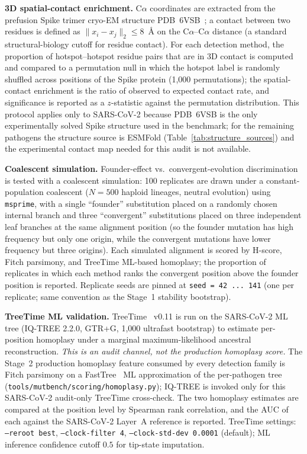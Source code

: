 \textbf{3D spatial-contact enrichment.} C$\alpha$ coordinates are extracted from the prefusion Spike trimer cryo-EM structure PDB~6VSB~\cite{wrapp2020cryo}; a contact between two residues is defined as $\|x_i - x_j\|_2 \leq 8$~\AA{} on the C$\alpha$--C$\alpha$ distance (a standard structural-biology cutoff for residue contact). For each detection method, the proportion of hotspot--hotspot residue pairs that are in 3D contact is computed and compared to a permutation null in which the hotspot label is randomly shuffled across positions of the Spike protein (1{,}000 permutations); the spatial-contact enrichment is the ratio of observed to expected contact rate, and significance is reported as a $z$-statistic against the permutation distribution. This protocol applies only to SARS-CoV-2 because PDB~6VSB is the only experimentally solved Spike structure used in the benchmark; for the remaining pathogens the structure source is ESMFold (Table~\ref{tab:structure_sources}) and the experimental contact map needed for this audit is not available.

\textbf{Coalescent simulation.} Founder-effect vs.\ convergent-evolution discrimination is tested with a coalescent simulation: 100 replicates are drawn under a constant-population coalescent ($N = 500$ haploid lineages, neutral evolution) using \texttt{msprime}, with a single ``founder'' substitution placed on a randomly chosen internal branch and three ``convergent'' substitutions placed on three independent leaf branches at the same alignment position (so the founder mutation has high frequency but only one origin, while the convergent mutations have lower frequency but three origins). Each simulated alignment is scored by H-score, Fitch parsimony, and TreeTime ML-based homoplasy; the proportion of replicates in which each method ranks the convergent position above the founder position is reported. Replicate seeds are pinned at \texttt{seed = 42\,...\,141} (one per replicate; same convention as the Stage~1 stability bootstrap).

\textbf{TreeTime ML validation.} TreeTime~\cite{sagulenko2018treetime} v0.11 is run on the SARS-CoV-2 ML tree (IQ-TREE 2.2.0, GTR+G, 1{,}000 ultrafast bootstrap) to estimate per-position homoplasy under a marginal maximum-likelihood ancestral reconstruction. \emph{This is an audit channel, not the production homoplasy score.} The Stage~2 production homoplasy feature consumed by every detection family is Fitch parsimony on a FastTree~\cite{price2010fasttree} ML approximation of the per-pathogen tree (\texttt{tools/mutbench/scoring/homoplasy.py}); IQ-TREE is invoked only for this SARS-CoV-2 audit-only TreeTime cross-check. The two homoplasy estimates are compared at the position level by Spearman rank correlation, and the AUC of each against the SARS-CoV-2 Layer~A reference is reported. TreeTime settings: \texttt{--reroot best}, \texttt{--clock-filter 4}, \texttt{--clock-std-dev 0.0001} (default); ML inference confidence cutoff $0.5$ for tip-state imputation.

